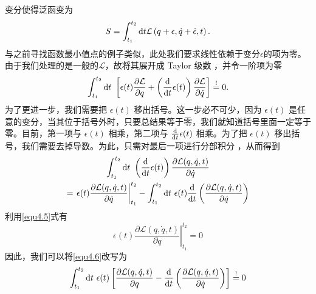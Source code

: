 变分使得泛函变为
\[
S = \int_{t_1}^{t_2} \mathrm d t {\mathcal L}\left(q+\epsilon,\dot q + \dot \epsilon, t\right).
\]
与之前寻找函数最小值点的例子类似，此处我们要求线性依赖于变分\(\epsilon\)的项为零。由于我们处理的是一般的\(\mathcal L\)，故将其展开成 Taylor 级数%
，并令一阶项为零
\begin{equation}
\int_{t_1}^{t_2} \mathrm d t ~ \left[ \epsilon(t) \frac{\partial \mathcal{L}}{\partial q} + \left( \frac{\mathrm d}{\mathrm d t} \epsilon(t) \right)\frac{\partial \mathcal{L}}{\partial \dot q} \right] \overset{\text{!}}{=} 0 .
\label{equ4.6}
\end{equation}
为了更进一步，我们需要把 \(\epsilon(t)\) 移出括号。这一步必不可少，因为 \(\epsilon(t)\) 是任意的变分，当其位于括号外时，只要总结果等于零，我们就知道括号里面一定等于零。目前，第一项与 \(\epsilon(t)\) 相乘，第二项与 \(\frac{\mathrm d}{\mathrm d t}\epsilon(t)\) 相乘。为了把 \(\epsilon(t)\) 移出括号，我们需要去掉导数。为此，只需对最后一项进行分部积分%
%
，从而得到
\[
\begin{gathered}
\int_{t_1}^{t_2} \mathrm d t ~ \left( \frac{\mathrm d}{\mathrm d t} \epsilon(t) \right)\frac{\partial \mathcal{L}(q,\dot q,t)}{\partial \dot q} \\
=\left.\epsilon(t)\frac{\partial \mathcal{L}(q,\dot q,t)}{\partial \dot q}\right|_{t_1}^{t_2} - \int_{t_1}^{t_2} \mathrm d t ~  \epsilon(t) \frac{\mathrm d}{\mathrm d t} \left( \frac{\partial \mathcal{L}(q,\dot q,t)}{\partial \dot q} \right)
\end{gathered}
\]
利用\eqref{equ4.5}式有
\[
\left.\epsilon(t)\frac{\partial \mathcal{L}(q,\dot q,t)}{\partial \dot q}\right|_{t_1}^{t_2} = 0
\]
因此，我们可以将\eqref{equ4.6}改写为
\[
\int_{t_1}^{t_2} \mathrm d t ~\epsilon(t) \left[ \frac{\partial \mathcal{L}(q,\dot q,t)}{\partial q} - \frac{\mathrm d}{\mathrm d t} \left( \frac{\partial \mathcal{L}(q,\dot q,t)}{\partial \dot q}\right) \right] \overset{\text{!}}{=} 0
\]
